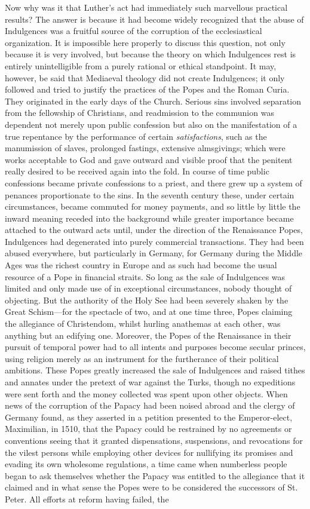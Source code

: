 \documentclass{book}
\begin{document}
Now why was it that Luther’s act had immediately such marvellous practical results? The answer is because it had become widely recognized that the abuse of Indulgences was a fruitful source of the corruption of the ecclesiastical organization. It is impossible here properly to discuss this question, not only because it is very involved, but because the theory on which Indulgences rest is entirely unintelligible from a purely rational or ethical standpoint. It may, however, be said that Mediaeval theology did not create Indulgences; it only followed and tried to justify the practices of the Popes and the Roman Curia. They originated in the early days of the Church. Serious sins involved separation from the fellowship of Christians, and readmission to the communion was dependent not merely upon public confession but also on the manifestation of a true repentance by the performance of certain \emph{satisfactions}, such as the manumission of slaves, prolonged fastings, extensive almsgivings; which were works acceptable to God and gave outward and visible proof that the penitent really desired to be received again into the fold. In course of time public confessions became private confessions to a priest, and there grew up a system of penances proportionate to the sins. In the seventh century these, under certain circumstances, became commuted for money payments, and so little by little the inward meaning receded into the background while greater importance became attached to the outward acts until, under the direction of the Renaissance Popes, Indulgences had degenerated into purely commercial transactions. They had been abused everywhere, but particularly in Germany, for Germany during the Middle Ages was the richest country in Europe and as such had become the usual resource of a Pope in financial straits. So long as the sale of Indulgences was limited and only made use of in exceptional circumstances, nobody thought of objecting. But the authority of the Holy See had been severely shaken by the Great Schism—for the spectacle of two, and at one time three, Popes claiming the allegiance of Christendom, whilst hurling anathemas at each other, was anything but an edifying one. Moreover, the Popes of the Renaissance in their pursuit of temporal power had to all intents and purposes become secular princes, using religion merely as an instrument for the furtherance of their political ambitions. These Popes greatly increased the sale of Indulgences and raised tithes and annates under the pretext of war against the Turks, though no expeditions were sent forth and the money collected was spent upon other objects. When news of the corruption of the Papacy had been noised abroad and the clergy of Germany found, as they asserted in a petition presented to the Emperor-elect, Maximilian, in 1510, that the Papacy could be restrained by no agreements or conventions seeing that it granted dispensations, suspensions, and revocations for the vilest persons while employing other devices for nullifying its promises and evading its own wholesome regulations, a time came when numberless people began to ask themselves whether the Papacy was entitled to the allegiance that it claimed and in what sense the Popes were to be considered the successors of St. Peter. All efforts at reform having failed, the 
\end{document}
